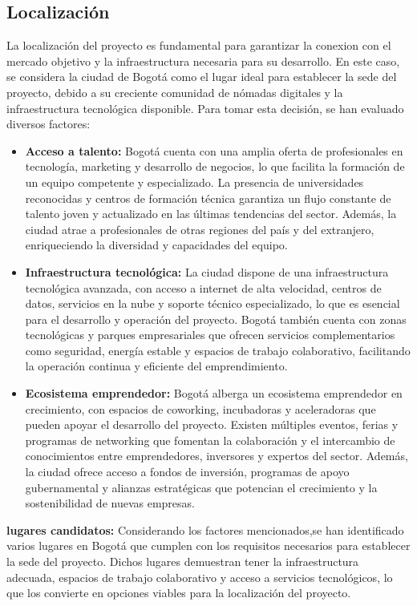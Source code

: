 \subsection*{Localización}
La localización del proyecto es fundamental para garantizar la conexion con el mercado objetivo y la infraestructura necesaria para su desarrollo. En este caso, se considera la ciudad de Bogotá como el lugar ideal para establecer la sede del proyecto, debido a su creciente comunidad de nómadas digitales y la infraestructura tecnológica disponible.
Para tomar esta decisión, se han evaluado diversos factores:
\begin{itemize}
    \item \textbf{Acceso a talento:} Bogotá cuenta con una amplia oferta de profesionales en tecnología, marketing y desarrollo de negocios, lo que facilita la formación de un equipo competente y especializado. La presencia de universidades reconocidas y centros de formación técnica garantiza un flujo constante de talento joven y actualizado en las últimas tendencias del sector. Además, la ciudad atrae a profesionales de otras regiones del país y del extranjero, enriqueciendo la diversidad y capacidades del equipo.

    \item \textbf{Infraestructura tecnológica:} La ciudad dispone de una infraestructura tecnológica avanzada, con acceso a internet de alta velocidad, centros de datos, servicios en la nube y soporte técnico especializado, lo que es esencial para el desarrollo y operación del proyecto. Bogotá también cuenta con zonas tecnológicas y parques empresariales que ofrecen servicios complementarios como seguridad, energía estable y espacios de trabajo colaborativo, facilitando la operación continua y eficiente del emprendimiento.

    \item \textbf{Ecosistema emprendedor:} Bogotá alberga un ecosistema emprendedor en crecimiento, con espacios de coworking, incubadoras y aceleradoras que pueden apoyar el desarrollo del proyecto. Existen múltiples eventos, ferias y programas de networking que fomentan la colaboración y el intercambio de conocimientos entre emprendedores, inversores y expertos del sector. Además, la ciudad ofrece acceso a fondos de inversión, programas de apoyo gubernamental y alianzas estratégicas que potencian el crecimiento y la sostenibilidad de nuevas empresas.
\end{itemize}

\textbf{lugares candidatos:} Considerando los factores mencionados,se han identificado varios lugares en Bogotá que cumplen con los requisitos necesarios para establecer la sede del proyecto. Dichos lugares demuestran tener la infraestructura adecuada, espacios de trabajo colaborativo y acceso a servicios tecnológicos, lo que los convierte en opciones viables para la localización del proyecto.

